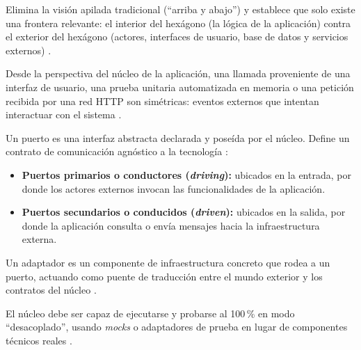 \begin{description}[itemsep=0.4em]
    \item[Distinción dentro/fuera (\emph{inside} vs. \emph{outside}):] Elimina la visión apilada tradicional (\enquote{arriba y abajo}) y establece que solo existe una frontera relevante: el interior del hexágono (la lógica de la aplicación) contra el exterior del hexágono (actores, interfaces de usuario, base de datos y servicios externos) \parencite{cockburn2005}.

    \item[Simetría de actores exteriores:] Desde la perspectiva del núcleo de la aplicación, una llamada proveniente de una interfaz de usuario, una prueba unitaria automatizada en memoria o una petición recibida por una red HTTP son simétricas: eventos externos que intentan interactuar con el sistema \parencite{cockburn2005}.

    \item[Puertos (\emph{ports}):] Un puerto es una interfaz abstracta declarada y poseída por el núcleo. Define un contrato de comunicación agnóstico a la tecnología \parencite{cockburn2005}:
        \begin{itemize}
            \item \textbf{Puertos primarios o conductores (\emph{driving}):} ubicados en la entrada, por donde los actores externos invocan las funcionalidades de la aplicación.
            \item \textbf{Puertos secundarios o conducidos (\emph{driven}):} ubicados en la salida, por donde la aplicación consulta o envía mensajes hacia la infraestructura externa.
        \end{itemize}

    \item[Adaptadores (\emph{adapters}):] Un adaptador es un componente de infraestructura concreto que rodea a un puerto, actuando como puente de traducción entre el mundo exterior y los contratos del núcleo \parencite{cockburn2005}.

    \item[Ejecución aislada (\emph{headless mode}):] El núcleo debe ser capaz de ejecutarse y probarse al 100\,\% en modo \enquote{desacoplado}, usando \emph{mocks} o adaptadores de prueba en lugar de componentes técnicos reales \parencite{cockburn2005}.
\end{description}

